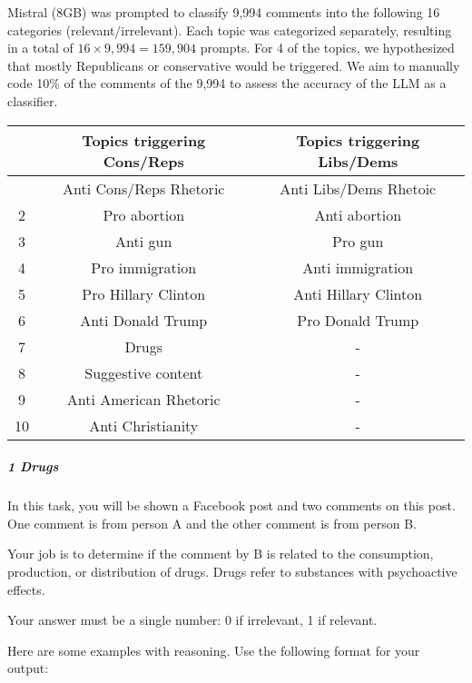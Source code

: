 \documentclass[
  letterpaper,
  DIV=11,
  numbers=noendperiod]{scrartcl}
\author{}
\date{}
\let\oldsubparagraph\subparagraph
\renewcommand{\subparagraph}[1]{\oldsubparagraph{#1}\mbox{}}
\begin{document}
\ifdefined\Shaded\renewenvironment{Shaded}{\begin{tcolorbox}[frame hidden, interior hidden, enhanced, breakable, sharp corners, borderline west={3pt}{0pt}{shadecolor}, boxrule=0pt]}{\end{tcolorbox}}\fi

Mistral (8GB) was prompted to classify 9,994 comments into the following
16 categories (relevant/irrelevant). Each topic was categorized
separately, resulting in a total of \(16 \times 9,994 = 159,904\)
prompts. For 4 of the topics, we hypothesized that mostly Republicans or
conservative would be triggered. We aim to manually code 10\% of the
comments of the 9,994 to assess the accuracy of the LLM as a classifier.

\begin{longtable}[]{@{}ccc@{}}
\toprule\noalign{}
& Topics triggering Cons/Reps & Topics triggering Libs/Dems \\
\midrule\noalign{}
\endhead
\bottomrule\noalign{}
\endlastfoot
1 & Anti Cons/Reps Rhetoric & Anti Libs/Dems Rhetoic \\
2 & Pro abortion & Anti abortion \\
3 & Anti gun & Pro gun \\
4 & Pro immigration & Anti immigration \\
5 & Pro Hillary Clinton & Anti Hillary Clinton \\
6 & Anti Donald Trump & Pro Donald Trump \\
7 & Drugs & - \\
8 & Suggestive content & - \\
9 & Anti American Rhetoric & - \\
10 & Anti Christianity & - \\
\end{longtable}

\clearpage

\hypertarget{drugs}{%
\subparagraph{1 Drugs}\label{drugs}}

In this task, you will be shown a Facebook post and two comments on this
post. One comment is from person A and the other comment is from person
B.

Your job is to determine if the comment by B is related to the
consumption, production, or distribution of drugs. Drugs refer to
substances with psychoactive effects.

Your answer must be a single number: 0 if irrelevant, 1 if relevant.

Here are some examples with reasoning. Use the following format for your
output:
\end{document}
